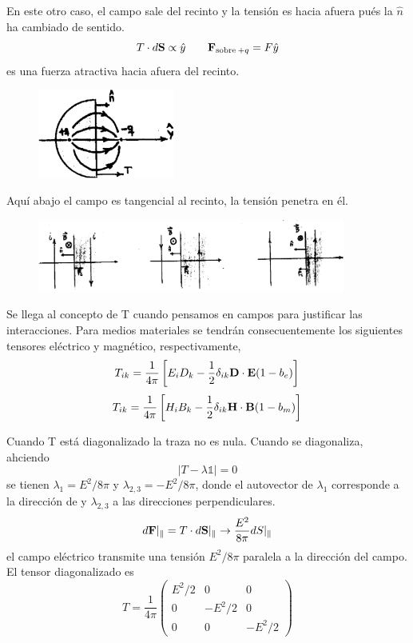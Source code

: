 \documentclass[10pt,oneside]{CBFT_book}
\begin{document}
En este otro caso, el campo sale del recinto y la tensión es hacia afuera pués la $\hat{n}$
ha cambiado de sentido.
\[
	T\cdot d\vb{S} \propto \hat{y} \qquad \vb{F}_{\text{sobre}\:+q} = F\hat{y}
\]
es una fuerza atractiva hacia afuera del recinto.
\begin{figure}[htb]
	\begin{center}
	\includegraphics[width=0.4\textwidth]{images/fig_ft1_tensorM4.pdf}	 
	\end{center}
	\caption{}
\end{figure} 

Aquí abajo el campo es tangencial al recinto, la tensión penetra en él.

\begin{figure}[htb]
	\begin{center}
	\includegraphics[width=0.9\textwidth]{images/fig_ft1_tensorM5.pdf}	 
	\end{center}
	\caption{}
\end{figure} 

Se llega al concepto de T cuando pensamos en campos para justificar las interacciones.
Para medios materiales se tendrán consecuentemente los siguientes tensores eléctrico
y magnético, respectivamente,
\[
	T_{ik} = \frac{1}{4\pi} \left[ E_iD_k - \frac{1}{2}\delta_{ik} \pe{D}{E}(1-b_e) \right] 
\]
\[
	T_{ik} = \frac{1}{4\pi} \left[ H_iB_k - \frac{1}{2}\delta_{ik} \pe{H}{B}(1-b_m)  \right] 
\]

Cuando T está diagonalizado la traza no es nula. Cuando se diagonaliza, ahciendo
\[
	| T - \lambda \mathbb{1} | = 0
\]
se tienen $\lambda_1 = E^2 / 8\pi$ y $\lambda_{2,3} = - E^2 / 8\pi$, donde el
autovector de $\lambda_1$ corresponde a la dirección de  y $\lambda_{2,3}$
a las direcciones perpendiculares.
\[
	d\vb{F}|_{\parallel} = T\cdot d\vb{S}|_{\parallel} \rightarrow \frac{E^2}{8\pi} dS|_{\parallel}
\]
el campo eléctrico transmite una tensión $E^2/8\pi$ paralela a la dirección del campo.
El tensor diagonalizado es 
\[
	T = \frac{1}{4\pi}\begin{pmatrix}
	        E^2/2	& 0 	& 0 \\
		0	& -E^2/2	& 0 \\
		0	& 0	& -E^2/2
	       \end{pmatrix}
\]
\end{document}
